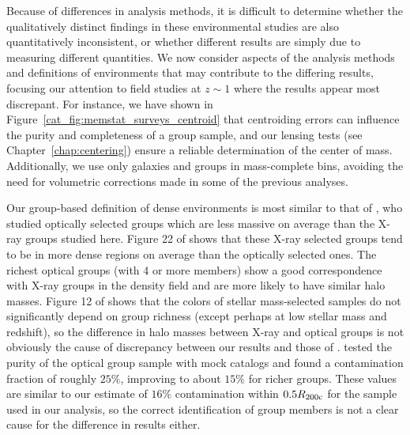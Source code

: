 Because of differences in analysis methods, it is difficult to
determine whether the qualitatively distinct findings in these
environmental studies are also quantitatively inconsistent, or whether
different results are simply due to measuring different quantities.
We now consider aspects of the analysis methods and
definitions of environments that may contribute
to the differing results, focusing our attention to field studies at $z\sim
1$ where the results appear most discrepant. For instance, we have shown in
Figure~\ref{cat_fig:memstat_surveys_centroid} that centroiding errors can
influence the purity and completeness of a 
group sample, and our lensing tests (see Chapter~\ref{chap:centering}) ensure a reliable
determination of the center of mass. Additionally, we use only galaxies and groups in
mass-complete bins, avoiding the need for volumetric corrections made
in some of the previous analyses.

Our group-based definition of 
dense environments is most similar to that of \citet{Iovino2010}, who
studied optically selected groups which are less massive on average
than the X-ray groups studied here. Figure 22 of \citet{Kovac2010a}
shows that these X-ray selected groups tend to be in more dense regions
on average than the optically selected ones. The richest optical
groups (with 4 or more members) show a good correspondence with X-ray
groups in the density field and are more likely to have similar halo
masses. Figure 12 of \citet{Iovino2010} shows that the colors of
stellar mass-selected samples do not significantly depend on group
richness (except perhaps at low stellar mass and redshift), so the
difference in halo masses between X-ray and optical groups is not
obviously the cause of discrepancy between our results and those of
\citet{Iovino2010}. \citet{Knobel2009} tested the purity of the
optical group sample with mock catalogs and found a contamination
fraction of roughly $25\%$, improving to about $15\%$ for richer
groups. These values are similar to our estimate of $16\%$
contamination within $0.5\mbox{$R_{200\rm{c}}$}$ for the sample used in our analysis,
so the correct identification of group members is not a clear cause for
the difference in results either.

